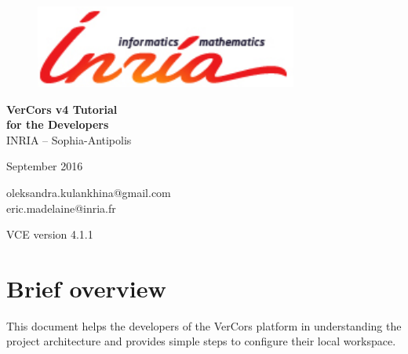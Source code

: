 \documentclass[12pt]{article}
\begin{document}
\begin{titlepage}

\begin{figure}[t]
    \centering
    \includegraphics[scale=0.4]{./draws/inria-logo.png}
\end{figure}

\vspace*{2cm}
\begin{center}
	{\huge \textbf{VerCors v4 Tutorial }} \vspace*{0.5cm}
\\
{\huge \textbf{for the Developers }} \vspace*{1cm}
\\
    {\large INRIA – Sophia-Antipolis } \medskip \\
\end{center}

%
\vfill
\begin{center}
\begin{minipage}[b]{0.5\textwidth}
    \vspace*{1.3cm}
    \begin{center}
        {\large September 2016}
    \end{center}
        \begin{center}
        {\large oleksandra.kulankhina@gmail.com \\
        \large eric.madelaine@inria.fr}
    \end{center}
     \vspace*{1cm}
        \begin{center}
        {\large VCE version 4.1.1}
    \end{center}
\end{minipage}%
\end{center}

\thispagestyle{empty}

\end{titlepage}

\tableofcontents
\newpage

\section{Brief overview}\label{sec:intro}
This document helps the developers of the VerCors platform in understanding the project architecture and provides simple steps to configure their local workspace. 
\end{document}
